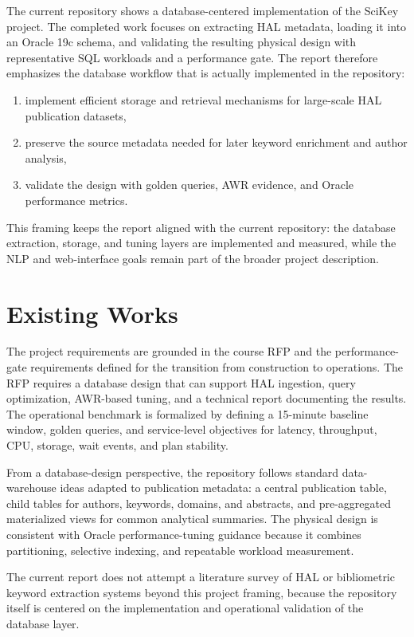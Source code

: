 \documentclass[conference]{IEEEtran}
\begin{document}
The current repository shows a database-centered implementation of the SciKey project. The completed work focuses on extracting HAL metadata, loading it into an Oracle 19c schema, and validating the resulting physical design with representative SQL workloads and a performance gate. The report therefore emphasizes the database workflow that is actually implemented in the repository:
\begin{enumerate}
    \item implement efficient storage and retrieval mechanisms for large-scale HAL publication datasets,
    \item preserve the source metadata needed for later keyword enrichment and author analysis,
    \item validate the design with golden queries, AWR evidence, and Oracle performance metrics.
\end{enumerate}

This framing keeps the report aligned with the current repository: the database extraction, storage, and tuning layers are implemented and measured, while the NLP and web-interface goals remain part of the broader project description.


\section{Existing Works}

The project requirements are grounded in the course RFP and the performance-gate requirements defined for the transition from construction to operations. The RFP requires a database design that can support HAL ingestion, query optimization, AWR-based tuning, and a technical report documenting the results. The operational benchmark is formalized by defining a 15-minute baseline window, golden queries, and service-level objectives for latency, throughput, CPU, storage, wait events, and plan stability.

From a database-design perspective, the repository follows standard data-warehouse ideas adapted to publication metadata: a central publication table, child tables for authors, keywords, domains, and abstracts, and pre-aggregated materialized views for common analytical summaries. The physical design is consistent with Oracle performance-tuning guidance because it combines partitioning, selective indexing, and repeatable workload measurement.

The current report does not attempt a literature survey of HAL or bibliometric keyword extraction systems beyond this project framing, because the repository itself is centered on the implementation and operational validation of the database layer.
\end{document}
